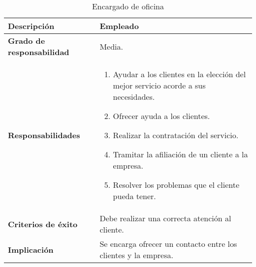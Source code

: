 \documentclass[12pt,spanish]{article}
\begin{document}

\begin{table}[H]
\begin{center}
\begin{tabular}{|l|p{10cm}|}
\hline
\textbf{Descripción} & Empleado \\
\hline
\textbf{Grado de responsabilidad} & Media. \\
\hline
\textbf{Responsabilidades} & 
\begin{minipage}{10cm}
    \vskip 1pt
    \begin{enumerate}
   		\item Ayudar a los clientes en la elección del mejor servicio acorde a sus necesidades.
   		\item Ofrecer ayuda a los clientes.
   		\item Realizar la contratación del servicio.
   		\item Tramitar la afiliación de un cliente a la empresa.
   		\item Resolver los problemas que el cliente pueda tener.
   \end{enumerate}
   \vskip 1pt
 \end{minipage}\\ 
\hline
\textbf{Criterios de éxito} & Debe realizar una correcta atención al cliente.\\
\hline
\textbf{Implicación} & Se encarga ofrecer un contacto entre los clientes y la empresa. \\
\hline
\end{tabular}
\caption{Encargado de oficina}
\end{center}
\end{table}
\end{document}
